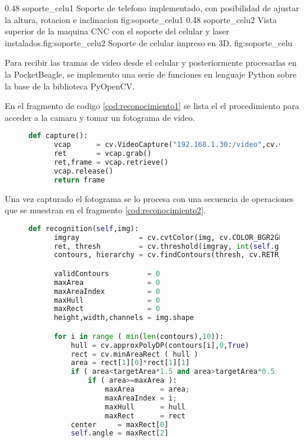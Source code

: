 \subfigab 
{0.48} {soporte_celu1} {Soporte de telefono implementado, con posibilidad de ajustar la altura, rotacion e inclinacion} {fig:soporte_celu1}
      {0.48} {soporte_celu2} {Vista superior de la maquina CNC con el soporte del celular y laser instalados.}{fig:soporte_celu2}
      {Soporte de celular impreso en 3D.}
      {fig:soporte_celu}

   Para recibir las tramas de video desde el celular y posteriormente procesarlas en la PocketBeagle, se implemento una serie de funciones en lenguaje Python sobre la base de la biblioteca PyOpenCV. \par
   En el fragmento de codigo \ref{cod:reconocimiento1} se lista el el procedimiento para acceder a la camara y tomar un fotograma de video.\par

\begin{figure}[h]
   \begin{lstlisting}[language=python,caption={Conexion a la camara del telefono por Wi-Fi y captura de un fotograma para su posterior procesamiento.},label={cod:reconocimiento1}]
   def capture():
      vcap      = cv.VideoCapture("192.168.1.30:/video",cv.CAP_FFMPEG);
      ret       = vcap.grab()
      ret,frame = vcap.retrieve()
      vcap.release()
      return frame
   \end{lstlisting}
\end{figure}

Una vez capturado el fotograma se lo procesa con una secuencia de operaciones que se muestran en el fragmento \ref{cod:reconocimiento2}.

\begin{figure}[h]
   \begin{lstlisting}[language=python,caption={Algoritmo principal de reconocimiento de marcas en un fotograma},label={cod:reconocimiento2}]
def recognition(self,img):
      imgray              = cv.cvtColor(img, cv.COLOR_BGR2GRAY)
      ret, thresh         = cv.threshold(imgray, int(self.grayThresh), 0xff, cv.THRESH_BINARY_INV)
      contours, hierarchy = cv.findContours(thresh, cv.RETR_EXTERNAL, cv.CHAIN_APPROX_SIMPLE)

      validContours         = 0
      maxArea               = 0
      maxAreaIndex          = 0
      maxHull               = 0
      maxRect               = 0
      height,width,channels = img.shape

      for i in range ( min(len(contours),10)):
          hull = cv.approxPolyDP(contours[i],0,True) 
          rect = cv.minAreaRect ( hull )
          area = rect[1][0]*rect[1][1]
          if ( area<targetArea*1.5 and area>targetArea*0.5 ):
              if ( area>=maxArea ):
                  maxArea      = area;
                  maxAreaIndex = i;
                  maxHull      = hull
                  maxRect      = rect
          center     = maxRect[0]
          self.angle = maxRect[2]
   \end{lstlisting}
\end{figure}

